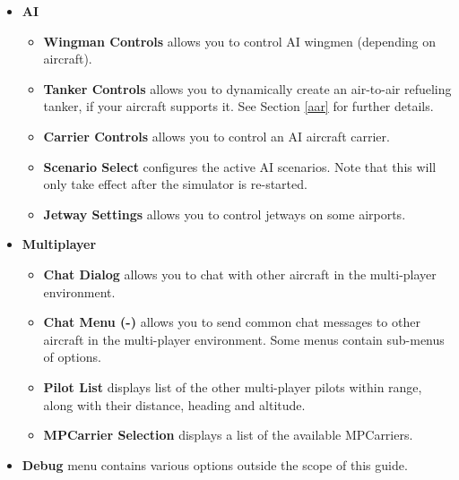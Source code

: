 \begin{itemize}
\item \textbf{AI}
 \begin{itemize}
  \item \textbf{Wingman Controls} allows you to control AI wingmen (depending on aircraft).
  \item \textbf{Tanker Controls}  allows you to dynamically create an air-to-air refueling
  tanker, if your aircraft supports it. See Section \ref{aar} for further details.
  \item \textbf{Carrier Controls} allows you to control an AI aircraft carrier.
  \item \textbf{Scenario Select}  configures the active AI scenarios.
  Note that this will only take effect after the simulator is re-started.
  \item \textbf{Jetway Settings}  allows you to control jetways on some airports.
 \end{itemize}

\item \textbf{Multiplayer}
 \begin{itemize}
  \item \textbf{Chat Dialog} allows you to chat with other aircraft in
the multi-player environment.
  \item \textbf{Chat Menu (-)} allows you to send common chat messages to
  other aircraft in the multi-player environment. Some menus
  contain sub-menus of options.
  \item \textbf{Pilot List} displays list of the other multi-player pilots
  within range, along with their distance, heading and altitude.
  \item \textbf{MPCarrier Selection} displays a list of the available MPCarriers.
\end{itemize}

\item \textbf{Debug} menu contains various options
outside the scope of this guide.


\end{itemize}
